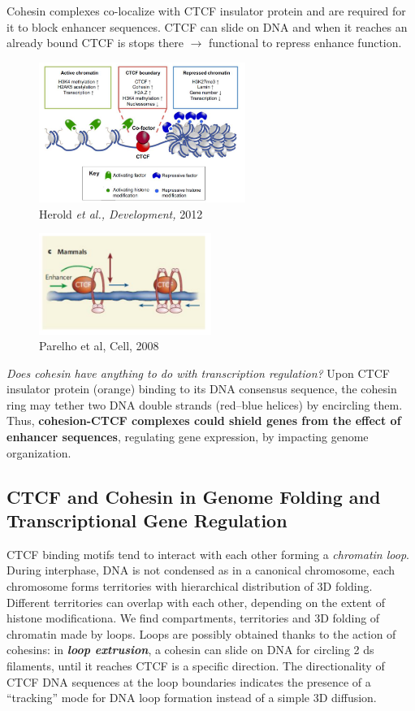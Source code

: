 Cohesin complexes co-localize with CTCF insulator protein and are required for it to block enhancer sequences. CTCF can slide on DNA and when it reaches an already bound CTCF is stops there $\rightarrow$ functional to repress enhance function.

\begin{figure}
\centering
\includegraphics[width=0.6\textwidth]{../_resources/Screenshot_2022-10-14_at_12-11-11.png}
\caption{Herold \emph{et al., Development,} 2012}
\end{figure}


\begin{figure}
\centering
\includegraphics[width=0.5\textwidth]{../_resources/Screenshot_2022-10-14_at_12-10-46.png}
\caption{Parelho et al, Cell, 2008}
\end{figure}

\emph{Does cohesin have anything to do with transcription regulation?}
Upon CTCF insulator protein (orange) binding to its DNA consensus sequence, the cohesin ring may tether two DNA double strands (red--blue helices) by encircling them. Thus, \textbf{cohesion-CTCF complexes could shield genes from the effect of enhancer sequences}, regulating gene expression, by impacting genome organization.

\subsection{CTCF and Cohesin in Genome Folding and Transcriptional Gene Regulation}

CTCF binding motifs tend to interact with each other forming a \emph{chromatin loop}. During interphase, DNA is not condensed as in a canonical chromosome, each chromosome forms territories with hierarchical distribution of 3D folding. Different territories can overlap with each other, depending on the extent of histone modificationa. We find compartments, territories and 3D folding of chromatin made by loops. Loops are possibly obtained thanks to the action of cohesins: in \textbf{\emph{loop extrusion}}, a cohesin can slide on DNA for circling 2 ds filaments, until it reaches CTCF is a specific direction. The directionality of CTCF DNA sequences at the loop boundaries indicates the presence of a ``tracking'' mode for DNA loop formation instead of a simple 3D diffusion.

